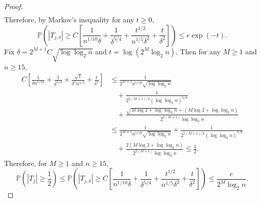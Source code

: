 \begin{proof}
\begin{align*}
\end{align*}
Therefore, by Markov's inequality for any $t\ge 0,$
\begin{equation}\label{eq:TjTailBound}
\mathbb{P}\left(|T_{j,\delta}| \ge C\left[\frac{1}{n^{1/10}\delta} + \frac{1}{\delta^{5/4}} + \frac{t^{1/2}}{n^{1/5}\delta^2} + \frac{t}{\delta^2}\right]\right) \le e\exp(-t).
\end{equation}
Fix  $\delta = 2^{{M+1}}C \sqrt{\log \log_2 n}$ and $t= \log(2^M \log_2 n)$. Then for any $M\ge 1$ and $n \ge 15$,
\begin{align*}
C\left[\frac{1}{\delta n^{1/10}} + \frac{1}{\delta^{5/4}} + \frac{\sqrt{t}}{\delta^2 n^{1/5}} + \frac{t}{\delta^2}\right] &\le \frac{1}{2^{M+1}n^{1/10}\sqrt{\log\log_2n}}\\ &\quad+ \frac{1}{2^{5(M+1)/4}(\log\log_2n)^{5/8}}\\ &\quad+ \frac{\sqrt{M\log 2 + \log\log_2n} + (M\log 2 + \log\log_2n)}{2^{2(M+1)}\log\log_2n}\\%
&\le \frac{1}{2^{M+1}n^{1/10}\sqrt{\log\log_2n}} + \frac{1}{2^{5(M+1)/4}(\log\log_2n)^{5/8}}\\ &\quad+ \frac{2(M\log 2 + \log\log_2n)}{2^{2(M+1)}\log\log_2n} \le \frac{1}{2}.
\end{align*}
Therefore, for $M \ge 1$ and $n \ge 15$,
\[
\mathbb{P}\left(|T_j| \ge \frac{1}{2}\right) \le \mathbb{P}\left(|T_{j,\delta}| \ge C\left[\frac{1}{n^{1/10}\delta} + \frac{1}{\delta^{5/4}} + \frac{t^{1/2}}{n^{1/5}\delta^2} + \frac{t}{\delta^2}\right]\right) \le \frac{e}{2^M\log_2n}.
\]
\end{proof}

